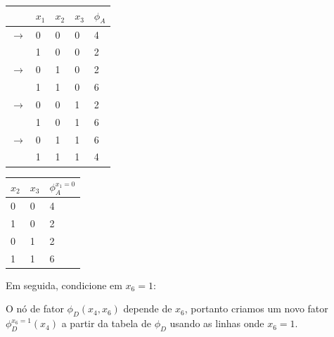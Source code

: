 \begin{exenumerate}
\begin{solution}
        \begin{center}
            \begin{tabular}{lllll}
                \toprule
                & $x_1$ & $x_2$ & $x_3$ & $\phi_A$\\
                \midrule
                $\rightarrow$ & 0 & 0 & 0 & 4 \\
                & 1 & 0 & 0 & 2 \\
                $\rightarrow$ & 0 & 1 & 0 & 2 \\
                & 1 & 1 & 0 & 6 \\
                $\rightarrow$ & 0 & 0 & 1 & 2 \\
                & 1 & 0 & 1 & 6 \\
                $\rightarrow$ & 0 & 1 & 1 & 6 \\
                & 1 & 1 & 1 & 4 \\
                \bottomrule
            \end{tabular}
            \hspace{3ex}  \hspace{3ex}
            \begin{tabular}{lll}
                \toprule
                $x_2$ & $x_3$ & $\phi_A^{x_1=0}$\\
                \midrule
                0 & 0 & 4 \\
                1 & 0 & 2 \\
                0 & 1 & 2 \\
                1 & 1 & 6 \\
                \bottomrule
            \end{tabular}
        \end{center}
        
        Em seguida, condicione em $x_6 = 1$:
        
        O n\'o de fator $\phi_D(x_4, x_6)$ depende de $x_6$, portanto criamos um novo fator $\phi_D^{x_6=1}(x_4)$ a partir da tabela de $\phi_D$ usando as linhas onde $x_6 = 1$.
        
        \begin{center}
\end{center}
\end{solution}
\end{exenumerate}
